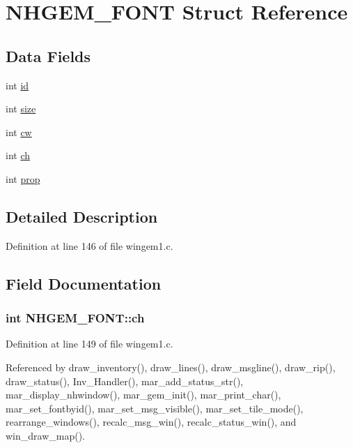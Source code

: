 \hypertarget{structNHGEM__FONT}{\section{N\+H\+G\+E\+M\+\_\+\+F\+O\+N\+T Struct Reference}
\label{structNHGEM__FONT}
}
\subsection*{Data Fields}
\begin{DoxyCompactItemize}
\item 
int \hyperlink{structNHGEM__FONT_af309e5f1e08051eec82df301c1676da6}{id}
\item 
int \hyperlink{structNHGEM__FONT_ad4fbac74e23e0597ab14e1b49750a824}{size}
\item 
int \hyperlink{structNHGEM__FONT_a52fa9ddaf433bd36c35baa45d03abb74}{cw}
\item 
int \hyperlink{structNHGEM__FONT_aaf0bfa2eedf7891f1c67582db1acb95d}{ch}
\item 
int \hyperlink{structNHGEM__FONT_ab44ccf5b3d4e4e9c7f3bfb97bf597ed3}{prop}
\end{DoxyCompactItemize}


\subsection{Detailed Description}


Definition at line 146 of file wingem1.\+c.



\subsection{Field Documentation}
\hypertarget{structNHGEM__FONT_aaf0bfa2eedf7891f1c67582db1acb95d}{
\subsubsection[{ch}]{\setlength{\rightskip}{0pt plus 5cm}int N\+H\+G\+E\+M\+\_\+\+F\+O\+N\+T\+::ch}}\label{structNHGEM__FONT_aaf0bfa2eedf7891f1c67582db1acb95d}


Definition at line 149 of file wingem1.\+c.



Referenced by draw\+\_\+inventory(), draw\+\_\+lines(), draw\+\_\+msgline(), draw\+\_\+rip(), draw\+\_\+status(), Inv\+\_\+\+Handler(), mar\+\_\+add\+\_\+status\+\_\+str(), mar\+\_\+display\+\_\+nhwindow(), mar\+\_\+gem\+\_\+init(), mar\+\_\+print\+\_\+char(), mar\+\_\+set\+\_\+fontbyid(), mar\+\_\+set\+\_\+msg\+\_\+visible(), mar\+\_\+set\+\_\+tile\+\_\+mode(), rearrange\+\_\+windows(), recalc\+\_\+msg\+\_\+win(), recalc\+\_\+status\+\_\+win(), and win\+\_\+draw\+\_\+map().

